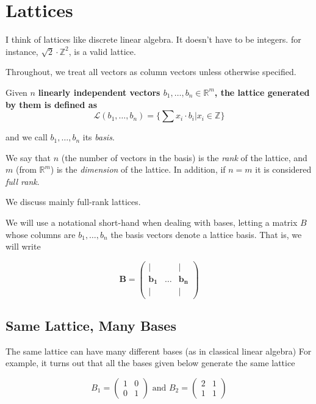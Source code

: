 
\chapter{Lattices}
I think of lattices like discrete linear algebra. 
It doesn't have to be integers. for instance, $\sqrt{2}\cdot \mathbb{Z}^2$, is a valid lattice.

Throughout, we treat all vectors as column vectors unless otherwise specified.

\begin{definition}[lattices]
    Given $n$ \bf{linearly independent} vectors $b_1,\dots, b_n\in \mathbb{R}^m$, the lattice generated by them is defined as
$$ 
\mathcal{L}(b_1,\dots, b_n) = \{\sum{x_i \cdot b_i} | x_i \in \mathbb{Z} \}
$$
    
and we call $b_1,\dots, b_n$ its \emph{basis}.
\end{definition}


\begin{definition}
We say that $n$ (the number of vectors in the basis) is the \emph{rank} of the lattice, and $m$ (from $\mathbb{R}^m$) is the \emph{dimension} of the lattice.
In addition, if $n=m$ it is considered \emph{full rank}.
\end{definition}

We discuss mainly full-rank lattices.


We will use a notational short-hand when dealing with bases, letting a matrix $B$ whose columns are $b_1,\dots, b_n$ the basis vectors denote a lattice basis. That is, we will write

$$ \mathbf{B}=\left(\begin{matrix}| &  & |\\
\mathbf{b_{1}} & \dots & \mathbf{b_{n}}\\
| &  & |
\end{matrix}\right) 
$$

\section{Same Lattice, Many Bases}

The same lattice can have many different bases (as in classical linear algebra)
For example, it turns out that all the bases given below generate the same 
lattice

$$ 
B_{1}=\left(\begin{matrix}1 & 0\\
0 & 1
\end{matrix}\right)\text{ and }B_{2}=\left(\begin{matrix}2 & 1\\
1 & 1
\end{matrix}\right)
$$


